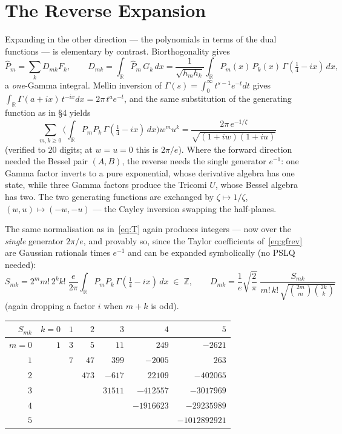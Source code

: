\documentclass[11pt,a4paper]{article}
\newcommand{\R}{\mathbb{R}}
\newcommand{\Z}{\mathbb{Z}}
\begin{document}
\section{The Reverse Expansion}

Expanding in the other direction — the polynomials in terms of the
dual functions — is elementary by contrast. Biorthogonality gives
\[
  \widehat{P}_m = \sum_k D_{mk} F_k,
  \qquad
  D_{mk} = \int_\R \widehat{P}_m\, G_k\, dx
  = \frac{1}{\sqrt{h_m h_k}}
    \int_\R P_m(x)\, P_k(x)\, \Gamma(\tfrac14-ix)\, dx,
\]
a \emph{one}-Gamma integral. Mellin inversion of
$\Gamma(s) = \int_0^\infty t^{s-1} e^{-t} dt$ gives
$\int_\R \Gamma(a+ix)\, t^{-ix} dx = 2\pi\, t^a e^{-t}$, and the same
substitution of the generating function as in \S4 yields
\begin{equation}\label{eq:gfrev}
  \sum_{m,k \ge 0}
  \Big( \textstyle\int_\R P_m P_k\, \Gamma(\tfrac14-ix)\, dx \Big)
  w^m u^k
  = \frac{2\pi\, e^{-1/\zeta}}{\sqrt{(1+iw)(1+iu)}}
\end{equation}
(verified to $20$ digits; at $w=u=0$ this is $2\pi/e$). Where the
forward direction needed the Bessel pair $(A, B)$, the reverse needs
the single generator $e^{-1}$: one Gamma factor inverts to a pure
exponential, whose derivative algebra has one state, while three
Gamma factors produce the Tricomi $U$, whose Bessel algebra has two.
The two generating functions are exchanged by
$\zeta \mapsto 1/\zeta$, $(w,u) \mapsto (-w,-u)$ --- the Cayley
inversion swapping the half-planes.

The same normalisation as in~\eqref{eq:T} again produces integers ---
now over the \emph{single} generator $2\pi/e$, and provably so, since
the Taylor coefficients of~\eqref{eq:gfrev} are Gaussian rationals
times $e^{-1}$ and can be expanded symbolically (no PSLQ needed):
\[
  S_{mk} = 2^m m!\, 2^k k!\; \frac{e}{2\pi}
  \int_\R P_m P_k\, \Gamma(\tfrac14 - ix)\, dx \;\in\; \Z,
  \qquad
  D_{mk} = \frac{1}{e}\sqrt{\frac{2}{\pi}}\;
  \frac{S_{mk}}{m!\, k!\, \sqrt{\binom{2m}{m}\binom{2k}{k}}}
\]
(again dropping a factor $i$ when $m+k$ is odd).

\begin{table}[ht]
\centering
\small
\begin{tabular}{r|rrrrrr}
$S_{mk}$ & $k=0$ & $1$ & $2$ & $3$ & $4$ & $5$ \\
\hline
$m=0$ & $1$ & $3$ & $5$ & $11$ & $249$ & $-2621$ \\
$1$ &  & $7$ & $47$ & $399$ & $-2005$ & $263$ \\
$2$ &  &  & $473$ & $-617$ & $22109$ & $-402065$ \\
$3$ &  &  &  & $31511$ & $-412557$ & $-3017969$ \\
$4$ &  &  &  &  & $-1916623$ & $-29235989$ \\
$5$ &  &  &  &  &  & $-1012892921$ \\
\end{tabular}
\end{table}
\end{document}
